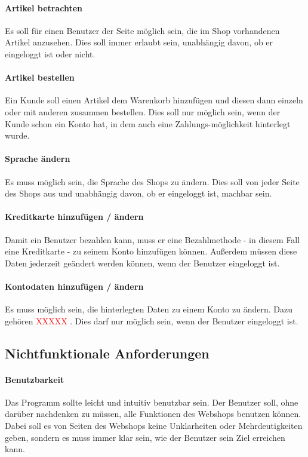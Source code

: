 \documentclass[a4paper]{article}
\begin{document}
\paragraph{Artikel betrachten}
Es soll für einen Benutzer der Seite möglich sein, die im Shop vorhandenen Artikel anzusehen. Dies soll immer erlaubt sein, unabhängig davon, ob er eingeloggt ist oder nicht.
\paragraph{Artikel bestellen}
Ein Kunde soll einen Artikel dem Warenkorb hinzufügen und diesen dann einzeln oder mit anderen zusammen bestellen. Dies soll nur möglich sein, wenn der Kunde schon ein Konto hat, in dem auch eine Zahlungs-möglichkeit hinterlegt wurde.
\paragraph{Sprache ändern}
Es muss möglich sein, die Sprache des Shops zu ändern. Dies soll von jeder Seite des Shops aus und unabhängig davon, ob er eingeloggt ist, machbar sein.
\paragraph{Kreditkarte hinzufügen / ändern}
Damit ein Benutzer bezahlen kann, muss er eine Bezahlmethode - in diesem Fall eine Kreditkarte - zu seinem Konto hinzufügen können. Außerdem müssen diese Daten jederzeit geändert werden können, wenn der Benutzer eingeloggt ist.
\paragraph{Kontodaten hinzufügen / ändern}
Es muss möglich sein, die hinterlegten Daten zu einem Konto zu ändern. Dazu gehören \textcolor{red}{XXXXX} . Dies darf nur möglich sein, wenn der Benutzer eingeloggt ist.

\subsection{Nichtfunktionale Anforderungen}
\paragraph{Benutzbarkeit}
Das Programm sollte leicht und intuitiv benutzbar sein. Der Benutzer soll, ohne darüber nachdenken zu müssen, alle Funktionen des Webshops benutzen können. Dabei soll es von Seiten des Webshops keine Unklarheiten oder Mehrdeutigkeiten geben, sondern es muss immer klar sein, wie der Benutzer sein Ziel erreichen kann.
\end{document}

